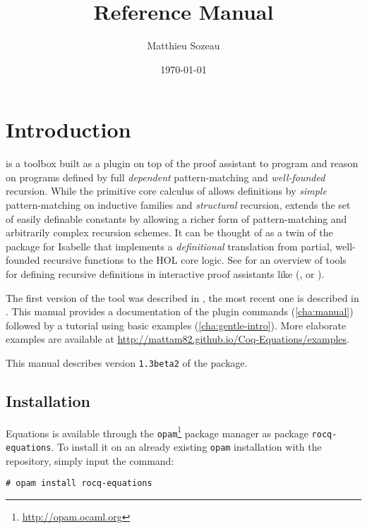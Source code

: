 \documentclass{report}
\author{Matthieu Sozeau}
\date{\today}
\title{\Equations \eqnversion Reference Manual}
\def\eqnversion{\texttt{1.3beta2}\xspace}
\begin{document}
\maketitle

\def\coqlibrary#1#2#3{}

\def\Equations{\texorpdfstring{\name{Equations}}{Equations}}

\chapter*{Introduction}
\label{cha:introduction}

\Equations is a toolbox built as a plugin on top of the \Coq proof assistant
to program and reason on programs defined by full \emph{dependent}
pattern-matching and \emph{well-founded} recursion. While the primitive
core calculus of \Coq allows definitions by \emph{simple} pattern-matching on
inductive families and \emph{structural} recursion, \Equations extends
the set of easily definable constants by allowing a richer form of
pattern-matching and arbitrarily complex recursion schemes. It can be
thought of as a twin of the  package for Isabelle that
implements a \emph{definitional} translation from partial, well-founded
recursive functions to the HOL core logic. See
\cite{BoveKraussSozeau2011} for an overview of tools for defining
recursive definitions in interactive proof assistants like (\Coq, \Agda
or \Isabelle).

The first version of the tool was described in
\cite{sozeau.Coq/Equations/ITP10}, the most recent one is described in
\cite{equationsreloaded}. This manual provides a documentation of the plugin
commands (\autoref{cha:manual}) followed by a tutorial using basic
examples (\autoref{cha:gentle-intro}).  More elaborate examples are
available at \url{http://mattam82.github.io/Coq-Equations/examples}.

This manual describes version \eqnversion of the package.

\section*{Installation}

Equations is available through the
\texttt{opam}\footnote{\url{http://opam.ocaml.org}} package manager as
package \texttt{rocq-equations}. To install it on an already existing
\texttt{opam} installation with the \Coq repository, simply input the
command:
\begin{verbatim}
# opam install rocq-equations
\end{verbatim}
\end{document}
